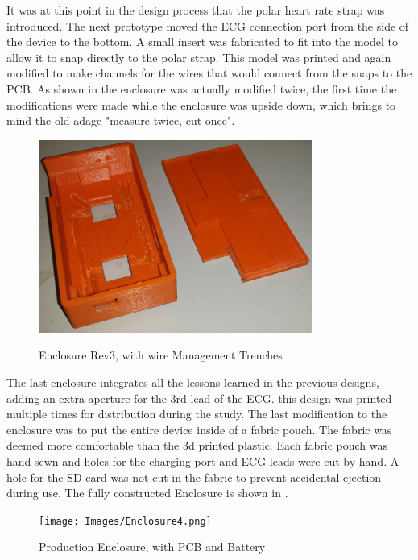 It was at this point in the design process that the polar heart rate strap was introduced. The next prototype moved the ECG connection port from the side of the device to the bottom. A small insert was fabricated to fit into the model to allow it to snap directly to the polar strap. This model was printed and again modified to make channels for the wires that would connect from the snaps to the PCB. As shown in  the enclosure was actually modified twice, the first time the modifications were made while the enclosure was upside down, which brings to mind the old adage "measure twice, cut once". 

\begin{figure}[h]
 \begin{center}
  \label{fig:enclosure3}
  \includegraphics[scale=1,width=0.8\textwidth]{Images/Enclosure3.png} 
  \caption{Enclosure Rev3, with wire Management Trenches} 
 \end{center}
\end{figure}


The last enclosure integrates all the lessons learned in the previous designs, adding an extra aperture for the 3rd lead of the ECG. this design was printed multiple times for distribution during the study. The last modification to the enclosure was to put the entire device inside of a fabric pouch. The fabric was deemed more comfortable than the 3d printed plastic. Each fabric pouch was hand sewn and holes for the charging port and ECG leads were cut by hand. A hole for the SD card was not cut in the fabric to prevent accidental ejection during use. The fully constructed Enclosure is shown in .

\begin{figure}[h]
 \begin{center}
  \label{fig:enclosure4}
  \texttt{[image: Images/Enclosure4.png]} 
  \caption{Production Enclosure, with PCB and Battery} 
 \end{center}
\end{figure}

